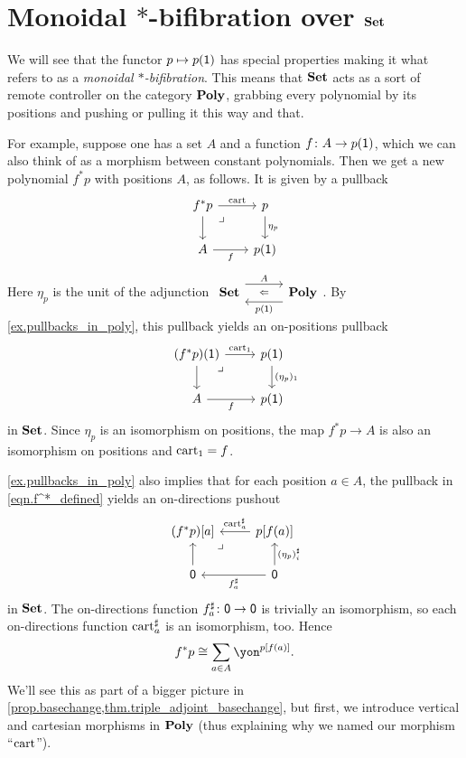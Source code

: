 \documentclass[Book-Poly]{subfiles}
\begin{document}
\section{Monoidal $*$-bifibration over $\mathbf{Set}$}

We will see that the functor $p\mapsto p(\textsf{1})$ has special properties making it what
\cite{shulman2008framed} refers to as a \emph{monoidal $*$-bifibration}. This means that $\mathbf{Set}$ acts as a sort of remote controller on the category $\mathbf{Poly}$, grabbing every polynomial by its positions and pushing or pulling it this way and that. 

For example, suppose one has a set $A$ and a function $f\colon A\to p(\textsf{1})$, which we can also think of as a morphism between constant polynomials.
Then we get a new polynomial $f^*p$ with positions $A$, as follows.
It is given by a pullback
\begin{equation}\label{eqn.f^*_defined}
\begin{tikzcd}
	f^*p\ar[r, "\fun{cart}"]\ar[d]&
	p\ar[d, "\eta_p"]\\
	A\ar[r, "f"']&
	p(\1)\ar[ul, phantom, very near end, "\lrcorner"]
\end{tikzcd}
\end{equation}
Here $\eta_p$ is the unit of the adjunction $\adjr{\smset}{A}{p(\1)}{\poly}$.
By \cref{ex.pullbacks_in_poly}, this pullback yields an on-positions pullback
\begin{equation}\label{eqn.f^*_defined_pos}
\begin{tikzcd}
	(f^*p)(\1) \ar[r, "\fun{cart}_1"] \ar[d] &
	p(\1) \ar[d, "(\eta_p)_1"] \\
	A \ar[r, "f"'] &
	p(\1) \ar[ul, phantom, very near end, "\lrcorner"]
\end{tikzcd}
\end{equation}
in $\mathbf{Set}$.
Since $\eta_p$ is an isomorphism on positions, the map $f^*p\to A$ is also an isomorphism on positions and $\mathrm{cart}_1 = f$.

\cref{ex.pullbacks_in_poly} also implies that for each position $a \in A$, the pullback in \eqref{eqn.f^*_defined} yields an on-directions pushout
\begin{equation}
\begin{tikzcd}
	(f^*p)[a] \ar[from=r, "\fun{cart}^\sharp_a"'] \ar[from=d] &
	p[f(a)] \ar[from=d, "(\eta_p)^\sharp_i"'] \\
	\0 \ar[from=r, "f^\sharp_a"] &
	\0 \ar[ul, phantom, very near end, "\lrcorner"]
\end{tikzcd}
\end{equation}
in $\mathbf{Set}$.
The on-directions function $f^\sharp_a \colon \textsf{0} \to \textsf{0}$ is trivially an isomorphism, so each on-directions function $\mathrm{cart}^\sharp_a$ is an isomorphism, too.
Hence
\[
    f^*p \iso \sum_{a \in A} \yon^{p[f(a)]}.
\]
We'll see this as part of a bigger picture in \cref{prop.basechange,thm.triple_adjoint_basechange}, but first, we introduce vertical and cartesian morphisms in $\mathbf{Poly}$ (thus explaining why we named our morphism ``$\mathrm{cart}$'').
\end{document}
